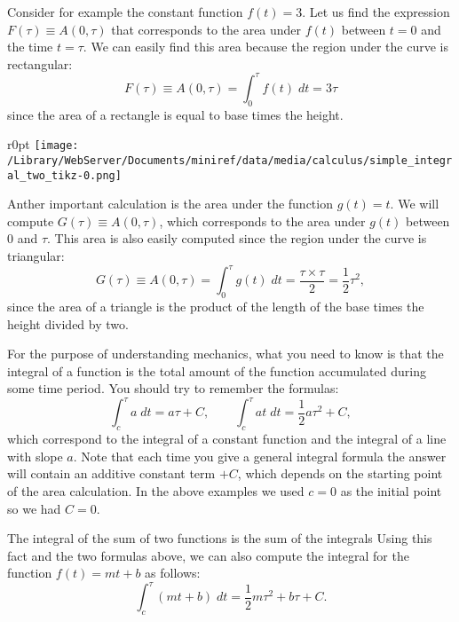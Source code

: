 \documentclass[letterpaper,9pt,journal]{IEEEtran}
\newcommand{\be}{\begin{equation}}
\newcommand{\ee}{\end{equation}}
\begin{document}
Consider for example the constant function $f(t)=3$.
Let us find the expression $F(\tau)\equiv A(0,\tau)$
that corresponds to the area under $f(t)$ between 
$t=0$ and the time $t=\tau$.
We can easily find this area because the region under the curve is rectangular:
\[ 
 \! F(\tau) \equiv A(0,\tau) =  \! \int_0^\tau \!\! f(t)\;dt  = 3 \tau
\]
since the area of a rectangle is equal to base times the height.


\begin{wrapfigure}{r}{0pt}
\texttt{[image: /Library/WebServer/Documents/miniref/data/media/calculus/simple\_integral\_two\_tikz-0.png]}
\end{wrapfigure}

Anther important calculation is the area under 
the function $g(t)=t$. We will compute $G(\tau)\equiv A(0,\tau)$,
which corresponds to the area under $g(t)$ between $0$ and $\tau$.
This area is also easily computed since the region under the curve 
is triangular:
\[
 \!\!G(\tau) \!\equiv \!A(0,\tau) \!=\! \int_0^\tau \!\! g(t) \; dt \!= \!\frac{\tau\times\tau}{2} \!= \!\frac{1}{2}\tau^2,
\]
since the area of a triangle is the product of the length of
the base times the height divided by two.


%

For the purpose of understanding mechanics,
what you need to know is that the integral of a function is the total amount of the function accumulated during some time period. 
You should try to remember the formulas:
\[
 \int_c^\tau a \;dt = a\tau + C, \qquad 
 \int_c^\tau at \;dt = \frac{1}{2}a\tau^2 + C,
\]
which correspond to the integral of a constant function
and the integral of a line with slope $a$.
Note that each time you give a general integral formula
the answer will contain an additive constant term $+C$,
which depends on the starting point of the area calculation. 
In the above examples we used $c=0$ as the initial
point so we had $C=0$.

The integral of the sum of two functions is the sum of the integrals
Using this fact and the two formulas above, 
we can also compute the integral for the function $f(t)=mt+b$ as follows:
\be
  \int_c^\tau (mt + b)\;dt 
 = \frac{1}{2}m\tau^2 + b \tau  + C.
  \label{integral-formula}
\ee
\end{document}
